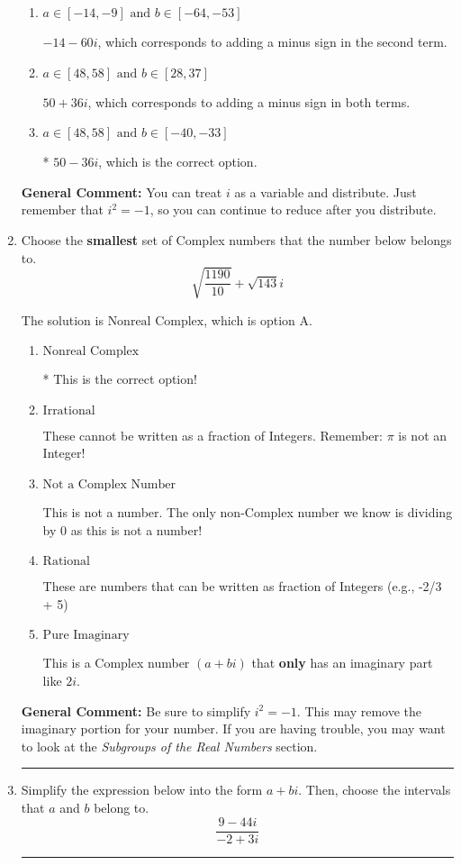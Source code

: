 \documentclass{extbook}[14pt]
\newcommand{\litem}[1]{\item #1

\rule{\textwidth}{0.4pt}}
\begin{document}
\begin{enumerate}
{\begin{enumerate}[label=\Alph*.]
 $18 - 32 i$, which corresponds to just multiplying the real terms to get the real part of the solution and the coefficients in the complex terms to get the complex part.
\item \( a \in [-14, -9] \text{ and } b \in [-64, -53] \)

 $-14 - 60 i$, which corresponds to adding a minus sign in the second term.
\item \( a \in [48, 58] \text{ and } b \in [28, 37] \)

 $50 + 36 i$, which corresponds to adding a minus sign in both terms.
\item \( a \in [48, 58] \text{ and } b \in [-40, -33] \)

* $50 - 36 i$, which is the correct option.
\end{enumerate}

\textbf{General Comment:} You can treat $i$ as a variable and distribute. Just remember that $i^2=-1$, so you can continue to reduce after you distribute.
}
\litem{
Choose the \textbf{smallest} set of Complex numbers that the number below belongs to.
\[ \sqrt{\frac{1190}{10}}+\sqrt{143} i \]

The solution is \( \text{Nonreal Complex} \), which is option A.\begin{enumerate}[label=\Alph*.]
\item \( \text{Nonreal Complex} \)

* This is the correct option!
\item \( \text{Irrational} \)

These cannot be written as a fraction of Integers. Remember: $\pi$ is not an Integer!
\item \( \text{Not a Complex Number} \)

This is not a number. The only non-Complex number we know is dividing by 0 as this is not a number!
\item \( \text{Rational} \)

These are numbers that can be written as fraction of Integers (e.g., -2/3 + 5)
\item \( \text{Pure Imaginary} \)

This is a Complex number $(a+bi)$ that \textbf{only} has an imaginary part like $2i$.
\end{enumerate}

\textbf{General Comment:} Be sure to simplify $i^2 = -1$. This may remove the imaginary portion for your number. If you are having trouble, you may want to look at the \textit{Subgroups of the Real Numbers} section.
}
\litem{
Simplify the expression below into the form $a+bi$. Then, choose the intervals that $a$ and $b$ belong to.
\[ \frac{9 - 44 i}{-2 + 3 i} \]

}
\end{enumerate}
\end{document}
